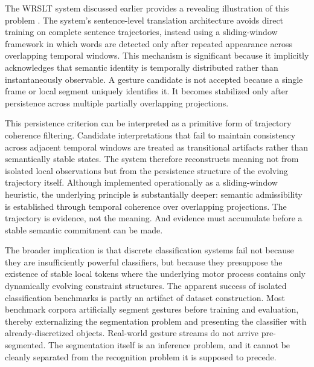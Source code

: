 \documentclass[11pt, a4paper]{article}
\theoremstyle{definition}
\begin{document}
The WRSLT system discussed earlier provides a revealing illustration of this problem \cite{park2026}. The system's sentence-level translation architecture avoids direct training on complete sentence trajectories, instead using a sliding-window framework in which words are detected only after repeated appearance across overlapping temporal windows. This mechanism is significant because it implicitly acknowledges that semantic identity is temporally distributed rather than instantaneously observable. A gesture candidate is not accepted because a single frame or local segment uniquely identifies it. It becomes stabilized only after persistence across multiple partially overlapping projections.

This persistence criterion can be interpreted as a primitive form of trajectory coherence filtering. Candidate interpretations that fail to maintain consistency across adjacent temporal windows are treated as transitional artifacts rather than semantically stable states. The system therefore reconstructs meaning not from isolated local observations but from the persistence structure of the evolving trajectory itself. Although implemented operationally as a sliding-window heuristic, the underlying principle is substantially deeper: semantic admissibility is established through temporal coherence over overlapping projections. The trajectory is evidence, not the meaning. And evidence must accumulate before a stable semantic commitment can be made.

The broader implication is that discrete classification systems fail not because they are insufficiently powerful classifiers, but because they presuppose the existence of stable local tokens where the underlying motor process contains only dynamically evolving constraint structures. The apparent success of isolated classification benchmarks is partly an artifact of dataset construction. Most benchmark corpora artificially segment gestures before training and evaluation, thereby externalizing the segmentation problem and presenting the classifier with already-discretized objects. Real-world gesture streams do not arrive pre-segmented. The segmentation itself is an inference problem, and it cannot be cleanly separated from the recognition problem it is supposed to precede.
\end{document}
